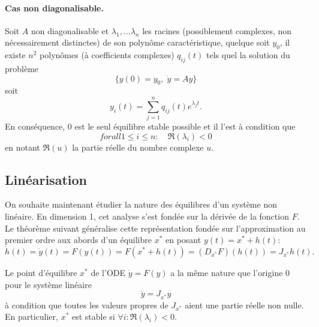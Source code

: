 \paragraph{Cas non diagonalisable.}

\begin{theorem*}
  Soit $A$ non diagonalisable et $\lambda_1, \dots \lambda_n$ les racines (possiblement complexes, non nécessairement distinctes) de son polynôme caractéristique, quelque soit $y_0$, il existe $n^2$ polynômes (à coefficients complexes) $q_{ij}(t)$ tels quel la solution du problème
  $$
  \{y(0) = y_0, \; \dot y = A y\}
  $$
  soit
  $$
  y_i(t) = \sum_{j=1}^n q_{ij}(t) e^{\lambda_j t}.
  $$
  En conséquence, 0 est le seul équilibre stable possible et il l'est à condition que
  $$
  forall 1 \leq i \leq n: \quad \Re(\lambda_i) < 0
  $$
  en notant $\Re(u)$ la partie réelle du nombre complexe $u$.
\end{theorem*}

\subsection{Linéarisation} 

On souhaite maintenant étudier la nature des équilibres d'un système non linéaire. En dimension 1, cet analyse s'est fondée sur la dérivée de la fonction $F$. Le théorème suivant généralise cette représentation fondée sur l'approximation au premier ordre aux abords d'un équilibre $x^*$ en posant $y(t) = x^* + h(t)$: 
$$
\dot h(t) = \dot y (t) = F(y(t)) = F(x^* + h(t)) = (D_{x^*} F)(h(t)) = J_{x^*} h(t).
$$

\begin{theorem*}
  Le point d'équilibre $x^*$ de l'ODE $\dot y = F(y)$ a la même nature que l'origine $0$ pour le système linéaire 
  $$
  \dot y = J_{x^*} y
  $$
  à condition que toutes les valeurs propres de $J_{x^*}$ aient une partie réelle non nulle. \\
  En particulier, $x^*$ est stable si $\forall i: \Re(\lambda_i) < 0$.
\end{theorem*}

